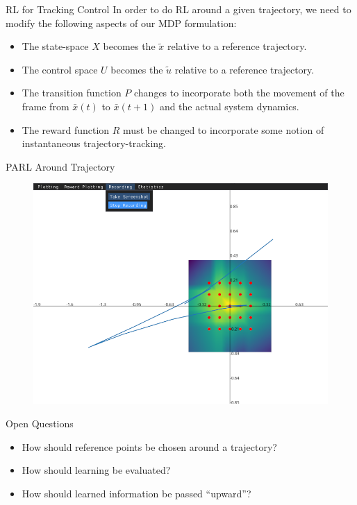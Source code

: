 \documentclass{beamer}
\begin{document}
\begin{frame}{RL for Tracking Control}
  In order to do RL around a given trajectory, we need to modify the following
  aspects of our MDP formulation:
  \begin{itemize}
    \item The state-space $X$ becomes the $\tilde{x}$ relative to a reference trajectory.
    \item The control space $U$ becomes the $\tilde{u}$ relative to a reference trajectory.
    \item The transition function $P$ changes to incorporate both the movement
      of the frame from $\bar{x}(t)$ to $\bar{x}(t+1)$ and the actual system
      dynamics.
    \item The reward function $R$ must be changed to incorporate some notion of
      instantaneous trajectory-tracking.
  \end{itemize}

\end{frame}

\begin{frame}{PARL Around Trajectory}
  \begin{figure}
    \centering
    \includegraphics[width=0.8\linewidth]{assets/traj_vals_thumb.png}
  \end{figure}
\end{frame}

\begin{frame}{Open Questions}
  \begin{itemize}
      \item How should reference points be chosen around a trajectory?
      \item How should learning be evaluated?
      \item How should learned information be passed ``upward''?
  \end{itemize}
\end{frame}
\end{document}
